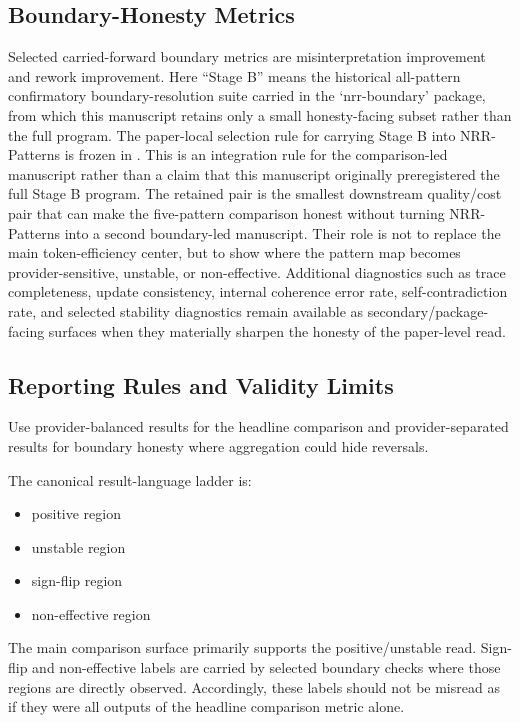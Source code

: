 \documentclass[11pt,a4paper]{article}
\begin{document}
\subsection{Boundary-Honesty Metrics}

Selected carried-forward boundary metrics are misinterpretation improvement and rework improvement. Here ``Stage B'' means the historical all-pattern confirmatory boundary-resolution suite carried in the `nrr-boundary' package, from which this manuscript retains only a small honesty-facing subset rather than the full program. The paper-local selection rule for carrying Stage B into NRR-Patterns is frozen in . This is an integration rule for the comparison-led manuscript rather than a claim that this manuscript originally preregistered the full Stage B program. The retained pair is the smallest downstream quality/cost pair that can make the five-pattern comparison honest without turning NRR-Patterns into a second boundary-led manuscript. Their role is not to replace the main token-efficiency center, but to show where the pattern map becomes provider-sensitive, unstable, or non-effective. Additional diagnostics such as trace completeness, update consistency, internal coherence error rate, self-contradiction rate, and selected stability diagnostics remain available as secondary/package-facing surfaces when they materially sharpen the honesty of the paper-level read.

\subsection{Reporting Rules and Validity Limits}

Use provider-balanced results for the headline comparison and provider-separated results for boundary honesty where aggregation could hide reversals.

The canonical result-language ladder is:
\begin{itemize}
  \item positive region
  \item unstable region
  \item sign-flip region
  \item non-effective region
\end{itemize}

The main comparison surface primarily supports the positive/unstable read. Sign-flip and non-effective labels are carried by selected boundary checks where those regions are directly observed. Accordingly, these labels should not be misread as if they were all outputs of the headline comparison metric alone.
\end{document}
